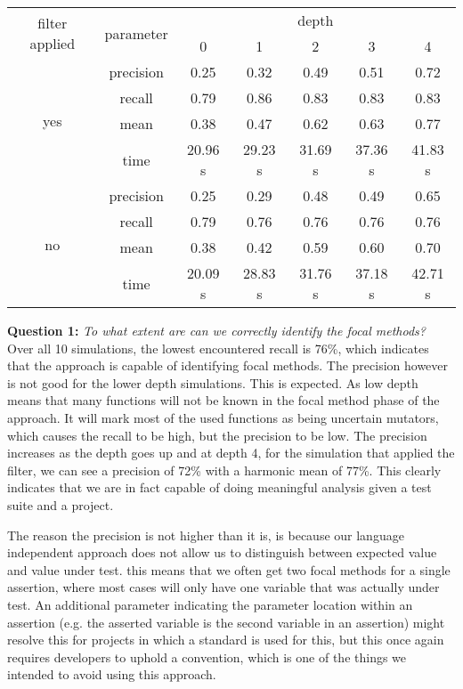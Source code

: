 \documentclass[11pt]{article}
\begin{document}
\begin{multicols}{2}
\begin{table*}[t]
	\centering
	\begin{tabular}{ |c|c|c|c|c|c|c|  }
		\hline
		\multirow{2}{*}{filter applied} & \multirow{2}{*}{parameter} & \multicolumn{5}{|c|}{depth} \\
		\cline{3-7}
		& & 0 & 1 & 2 & 3 & 4\\
		\hline
		\multirow{4}{*}{yes} & precision & 0.25 & 0.32 & 0.49 & 0.51 & 0.72\\
		\cline{2-7}
		& recall & 0.79 & 0.86 & 0.83 & 0.83 & 0.83\\
		\cline{2-7}
		& mean & 0.38 & 0.47 & 0.62 & 0.63 & 0.77\\
		\cline{2-7}
		& time & 20.96 s & 29.23 s &  31.69 s & 37.36 s  & 41.83 s \\
		\hline
		\multirow{4}{*}{no} & precision & 0.25 & 0.29 & 0.48 & 0.49 & 0.65\\
		\cline{2-7}
		& recall & 0.79 & 0.76 & 0.76 & 0.76 & 0.76\\
		\cline{2-7}
		& mean & 0.38 & 0.42 & 0.59 & 0.60 & 0.70\\
		\cline{2-7}
		& time & 20.09 s & 28.83 s &  31.76 s & 37.18 s & 42.71 s \\
		\hline
	\end{tabular}
\end{table*}

\textbf{Question 1:} \textit{To what extent are can we correctly identify the focal methods?}\\
Over all 10 simulations, the lowest encountered recall is 76\%, which indicates that the approach is capable of identifying focal methods. The precision however is not good for the lower depth simulations. This is expected. As low depth means that many functions will not be known in the focal method phase of the approach. It will mark most of the used functions as being uncertain mutators, which causes the recall to be high, but the precision to be low. The precision increases as the depth goes up and at depth 4, for the simulation that applied the filter, we can see a precision of 72\% with a harmonic mean of 77\%. This clearly indicates that we are in fact capable of doing meaningful analysis given a test suite and a project.

The reason the precision is not higher than it is, is because our language independent approach does not allow us to distinguish between expected value and value under test. this means that we often get two focal methods for a single assertion, where most cases will only have one variable that was actually under test. An additional parameter indicating the parameter location within an assertion (e.g. the asserted variable is the second variable in an assertion) might resolve this for projects in which a standard is used for this, but this once again requires developers to uphold a convention, which is one of the things we intended to avoid using this approach.


\end{multicols}
\end{document}
